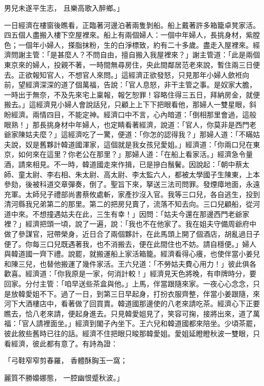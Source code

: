 \begin{showcontents}{}
男兒未遂平生志，  且樂高歌入醉鄉。」

一日經濟在樓窗後瞧看，正臨著河邊泊著兩隻剝船。船上戴著許多箱籠卓凳家活。四五個人盡搬入樓下空屋裡來。船上有兩個婦人：一個中年婦人，長挑身材，紫膛色；一個年小婦人，搽脂抹粉，生的白淨標致，約有二十多歲。盡走入屋裡來。經濟問謝主管：「是甚麼人？不問自由，擅自搬入我屋裡來？」謝主管道：「此是兩個東京來的婦人，投親不著，一時間無尋房住，央此間鄰居范老來說，暫住兩三日便去。正欲報知官人，不想官人來問。」這經濟正欲發怒，只見那年小婦人歛袵向前，望經濟深深的道了個萬福，告說：「官人息怒，非干主管之事。是奴家大膽，一時出于無奈，不及先來宅上稟報，報乞恕罪！容略住得三五日，拜納房金，就便搬去。」這經濟見小婦人會說話兒，只顧上上下下把眼看他，那婦人一雙星眼，斜盼經濟。兩情四目，不能定神。經濟口中不言，心內暗道：「倒相那里會過，這般眼熟！」那長挑身材中年婦人，也定睛看著經濟，說道：「官人，你莫非是西門老爺家陳姑夫麼？」這經濟吃了一驚，便道：「你怎的認得我？」那婦人道：「不瞞姑夫說，奴是舊夥計韓道國渾家，這個就是我女孩兒愛姐。」經濟道：「你兩口兒在東京，如何來在這里？你老公在那里？」那婦人道：「在船上看家活。」經濟急令量酒，請來相見。不一時，韓道國走來作揖，已是摻白鬚鬢。因說起：「朝中蔡太師、童太尉、李右相、朱太尉、高太尉、李太監六人，都被太學國子生陳東，上本參劾，後被科道交章彈奏，倒了。聖旨下來，拏送三法司問罪。發煙瘴地面，永遠充軍。太師兒子禮部尚書蔡攸處斬，家產抄沒入官。我等三口兒，各自逃生，投到清河縣我兄弟第二的那里。第二的把房兒賣了，流落不知去向。三口兒顧船，從河道中來。不想撞遇姑夫在此，三生有幸！」因問：「姑夫今還在那邊西門老爺家裡？」經濟把頭一頃，說了一遍，說：「我也不在他家了。我在姐夫守備周爺府中做了參謀官，冠帶榮身，近日合了兩個夥計，在此馬頭上開了個酒店，胡亂過日子便了。你每三口兒既遇著我，也不消搬去，便在此間住也不妨。請自穩便。」婦人與韓道國一齊下禮。說罷，就搬運船上家活箱籠。經濟看得心癢，也使伴當小姜兒和陳三兒，也替他搬運了幾件家活。王六兒道：「不勞姑夫費心用力！」彼此俱各歡喜。經濟道：「你我原是一家，何消計較！」經濟見天色將晚，有申牌時分，要回家。分付主管：「咱早送些茶盒與他。」上馬，伴當跟隨來家。一夜心心念念，只是放韓愛姐不下。過了一日，到第三日早起身，打扮衣服齊整，伴當小姜跟隨，來河下大酒樓店中，看著做了回買賣。韓道國那邊使的八老來請吃茶。經濟心下正要瞧去，恰八老來請，便起身進去。只見韓愛姐見了，笑容可掬，接將出來，道了萬福：「官人請裡面坐。」經濟到閣子內坐下。王六兒和韓道國都來陪坐。少頃茶罷，彼此敘些舊時已往的話。經濟不住把眼只睃那韓愛姐。愛姐延瞪瞪秋波一雙眼，只看經濟，彼此都有意了。有詩為證：

「弓鞋窄窄剪春羅，  香體酥胸玉一窩；

麗質不勝嬝娜態，  一腔幽恨蹙秋波。」


\end{showcontents}
